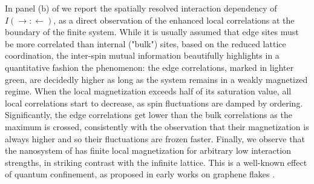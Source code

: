 \documentclass[edipack_sp.tex]{subfiles}
\begin{document}
In panel (b) of  we report the spatially resolved
interaction dependency of $I(\rightarrow:\leftarrow)$, as a direct 
observation of the enhanced local correlations at the boundary of the
finite system. While it is usually assumed that edge sites must be
more correlated than internal ("bulk") sites, based on the reduced
lattice coordination, the inter-spin mutual information beautifully
highlights in a quantitative fashion the phenomenon: the edge correlations,
marked in lighter green, are decidedly higher as long as the system 
remains in a weakly magnetized regime. When the local magnetization
exceeds half of its saturation value, all local correlations start to decrease,
as spin fluctuations are damped by ordering. Significantly, the edge 
correlations get lower than the bulk correlations as the maximum is 
crossed, consistently with the observation that their magnetization
is always higher and so their fluctuations are frozen faster.
Finally, we observe that the nanosystem of  has 
finite local magnetization for arbitrary low interaction strengths,
in striking contrast with the infinite lattice. This is a well-known
effect of quantum confinement, as proposed in early works on graphene
flakes \cite{Valli2016PRB,Valli2018NL}.
\end{document}
